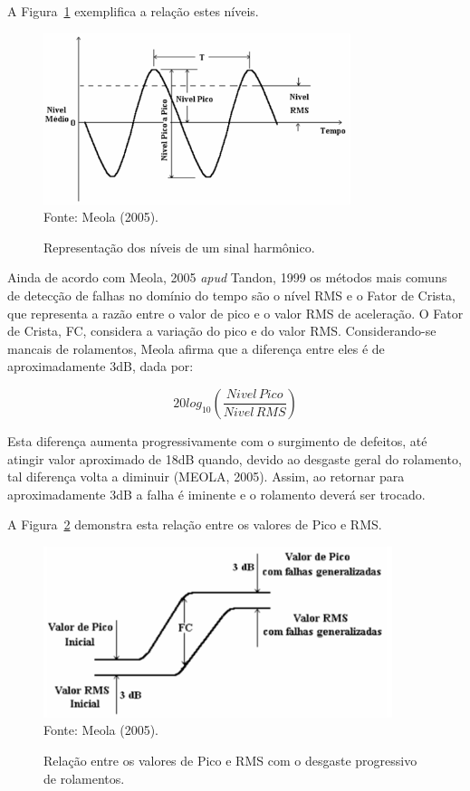 \documentclass[
	12pt,				
	oneside,			
	a4paper,			
	english,			
	brazil,	
	sumario=abnt-6027-2012		
	]{abntex2ppgsi}
\begin{document}
A Figura~\ref{RelacaoSinalHarmonico} exemplifica a relação estes níveis.

\begin{figure}[!htb]
\centering
\caption {Representação dos níveis de um sinal harmônico.}
\includegraphics[width=\textwidth,height=50mm,keepaspectratio]{Figura17} \\
Fonte: Meola (2005).
\label{RelacaoSinalHarmonico}
\end{figure}

Ainda de acordo com Meola, 2005 \textit{apud} Tandon, 1999 os métodos mais comuns de detecção de falhas no domínio do tempo são o nível RMS e o Fator de Crista, que representa a razão entre o valor de pico e o valor RMS de aceleração. O Fator de Crista, FC, considera a variação do pico e do valor RMS. Considerando-se mancais de rolamentos, Meola afirma que a diferença entre eles é de aproximadamente 3dB, dada por:

\begin{equation}
	20log_{10} \left ( \frac{Nivel \,Pico}{Nivel \, RMS} \right )
	\label{eq: Nível de Pico vs RMS}
\end{equation}

Esta diferença aumenta progressivamente com o surgimento de defeitos, até atingir valor aproximado de 18dB quando, devido ao desgaste geral do rolamento, tal diferença volta a diminuir (MEOLA, 2005). Assim, ao retornar para aproximadamente 3dB a falha é iminente e o rolamento deverá ser trocado. 

A Figura~\ref{RelacaoPicoaPicoeRMS} demonstra esta relação entre os valores de Pico e RMS.  

\begin{figure}[!htb]
\centering
\caption {Relação entre os valores de Pico e RMS com o desgaste progressivo de rolamentos.}
\includegraphics[width=\textwidth,height=50mm,keepaspectratio]{Figura18} \\
Fonte: Meola (2005).
\label{RelacaoPicoaPicoeRMS}
\end{figure}	
\end{document}
